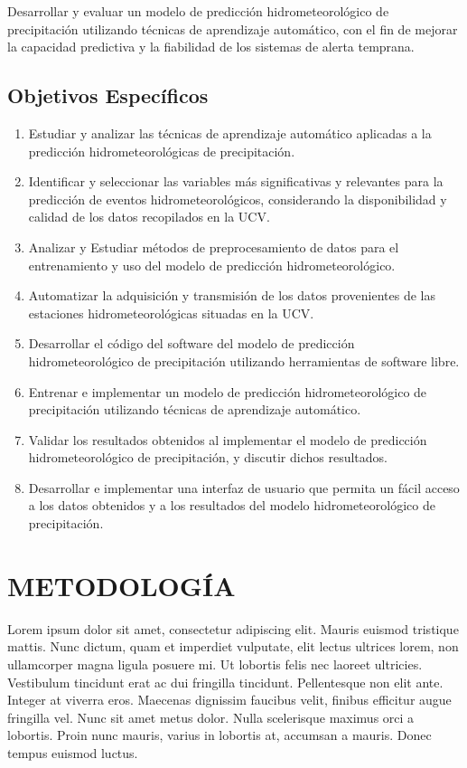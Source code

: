 \documentclass[stu, 12pt, helv, letterpaper, donotrepeattitle, floatsintext, natbib]{apa7}
\begin{document}
Desarrollar y evaluar un modelo de predicción hidrometeorológico de precipitación utilizando técnicas de aprendizaje automático, con el fin de mejorar la capacidad predictiva y la fiabilidad de los sistemas de alerta temprana.

\subsection*{Objetivos Específicos}

\begin{enumerate}
    \item Estudiar y analizar las técnicas de aprendizaje automático aplicadas a la predicción hidrometeorológicas de precipitación.
    \item Identificar y seleccionar las variables más significativas y relevantes para la predicción de eventos hidrometeorológicos, considerando la disponibilidad y calidad de los datos recopilados en la UCV.
    \item Analizar y Estudiar métodos de preprocesamiento de datos para el entrenamiento y uso del modelo de predicción hidrometeorológico.
    \item Automatizar la adquisición y transmisión de los datos provenientes de las estaciones hidrometeorológicas situadas en la UCV.
    \item Desarrollar el código del software del modelo de predicción hidrometeorológico de precipitación utilizando herramientas de software libre. 
    \item Entrenar e implementar un modelo de predicción hidrometeorológico de precipitación utilizando técnicas de aprendizaje automático.
    \item Validar los resultados obtenidos al implementar el modelo de predicción hidrometeorológico de precipitación, y discutir dichos resultados.
    \item Desarrollar e implementar una interfaz de usuario que permita un fácil acceso a los datos obtenidos y a los resultados del modelo hidrometeorológico de precipitación.

\end{enumerate}


\section*{METODOLOGÍA}

Lorem ipsum dolor sit amet, consectetur adipiscing elit. Mauris euismod tristique mattis. Nunc dictum, quam et imperdiet vulputate, elit lectus ultrices lorem, non ullamcorper magna ligula posuere mi. Ut lobortis felis nec laoreet ultricies. Vestibulum tincidunt erat ac dui fringilla tincidunt. Pellentesque non elit ante. Integer at viverra eros. Maecenas dignissim faucibus velit, finibus efficitur augue fringilla vel. Nunc sit amet metus dolor. Nulla scelerisque maximus orci a lobortis. Proin nunc mauris, varius in lobortis at, accumsan a mauris. Donec tempus euismod luctus.
\end{document}
